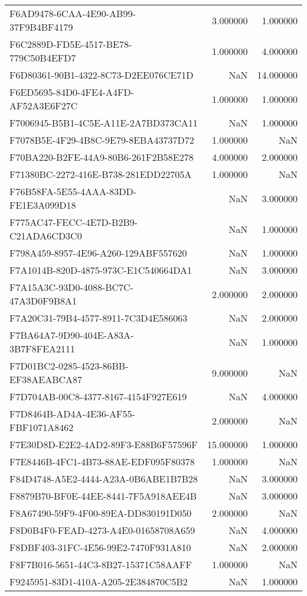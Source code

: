 \begin{tabular}{lrr}
F6AD9478-6CAA-4E90-AB99-37F9B4BF4179 & 3.000000 & 1.000000 \\
F6C2889D-FD5E-4517-BE78-779C50B4EFD7 & 1.000000 & 4.000000 \\
F6D80361-90B1-4322-8C73-D2EE076CE71D & NaN & 14.000000 \\
F6ED5695-84D0-4FE4-A4FD-AF52A3E6F27C & 1.000000 & 1.000000 \\
F7006945-B5B1-4C5E-A11E-2A7BD373CA11 & NaN & 1.000000 \\
F7078B5E-4F29-4B8C-9E79-8EBA43737D72 & 1.000000 & NaN \\
F70BA220-B2FE-44A9-80B6-261F2B58E278 & 4.000000 & 2.000000 \\
F71380BC-2272-416E-B738-281EDD22705A & 1.000000 & NaN \\
F76B58FA-5E55-4AAA-83DD-FE1E3A099D18 & NaN & 3.000000 \\
F775AC47-FECC-4E7D-B2B9-C21ADA6CD3C0 & NaN & 1.000000 \\
F798A459-8957-4E96-A260-129ABF557620 & NaN & 1.000000 \\
F7A1014B-820D-4875-973C-E1C540664DA1 & NaN & 3.000000 \\
F7A15A3C-93D0-4088-BC7C-47A3D0F9B8A1 & 2.000000 & 2.000000 \\
F7A20C31-79B4-4577-8911-7C3D4E586063 & NaN & 2.000000 \\
F7BA64A7-9D90-404E-A83A-3B7F8FEA2111 & NaN & 1.000000 \\
F7D01BC2-0285-4523-86BB-EF38AEABCA87 & 9.000000 & NaN \\
F7D704AB-00C8-4377-8167-4154F927E619 & NaN & 4.000000 \\
F7D8464B-AD4A-4E36-AF55-FBF1071A8462 & 2.000000 & NaN \\
F7E30D8D-E2E2-4AD2-89F3-E88B6F57596F & 15.000000 & 1.000000 \\
F7E8446B-4FC1-4B73-88AE-EDF095F80378 & 1.000000 & NaN \\
F84D4748-A5E2-4444-A23A-0B6ABE1B7B28 & NaN & 3.000000 \\
F8879B70-BF0E-44EE-8441-7F5A918AEE4B & NaN & 3.000000 \\
F8A67490-59F9-4F00-89EA-DD830191D050 & 2.000000 & NaN \\
F8D0B4F0-FEAD-4273-A4E0-01658708A659 & NaN & 4.000000 \\
F8DBF403-31FC-4E56-99E2-7470F931A810 & NaN & 2.000000 \\
F8F7B016-5651-44C3-8B27-15371C58AAFF & 1.000000 & NaN \\
F9245951-83D1-410A-A205-2E384870C5B2 & NaN & 1.000000 \\

\end{tabular}
